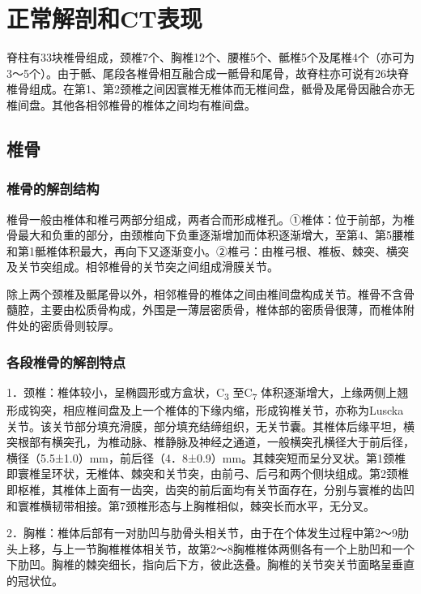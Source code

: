 \section{正常解剖和CT表现}

脊柱有33块椎骨组成，颈椎7个、胸椎12个、腰椎5个、骶椎5个及尾椎4个（亦可为3～5个）。由于骶、尾段各椎骨相互融合成一骶骨和尾骨，故脊柱亦可说有26块脊椎骨组成。在第1、第2颈椎之间因寰椎无椎体而无椎间盘，骶骨及尾骨因融合亦无椎间盘。其他各相邻椎骨的椎体之间均有椎间盘。

\subsection{椎骨}

\subsubsection{椎骨的解剖结构}

椎骨一般由椎体和椎弓两部分组成，两者合而形成椎孔。①椎体：位于前部，为椎骨最大和负重的部分，由颈椎向下负重逐渐增加而体积逐渐增大，至第4、第5腰椎和第1骶椎体积最大，再向下又逐渐变小。②椎弓：由椎弓根、椎板、棘突、横突及关节突组成。相邻椎骨的关节突之间组成滑膜关节。

除上两个颈椎及骶尾骨以外，相邻椎骨的椎体之间由椎间盘构成关节。椎骨不含骨髓腔，主要由松质骨构成，外围是一薄层密质骨，椎体部的密质骨很薄，而椎体附件处的密质骨则较厚。

\subsubsection{各段椎骨的解剖特点}

1．颈椎：椎体较小，呈椭圆形或方盒状，C\textsubscript{3}
至C\textsubscript{7}
体积逐渐增大，上缘两侧上翘形成钩突，相应椎间盘及上一个椎体的下缘内缩，形成钩椎关节，亦称为Luscka关节。该关节部分填充滑膜，部分填充结缔组织，无关节囊。其椎体后缘平坦，横突根部有横突孔，为椎动脉、椎静脉及神经之通道，一般横突孔横径大于前后径，横径（5.5±1.0）mm，前后径（4．8±0.9）mm。其棘突短而呈分叉状。第1颈椎即寰椎呈环状，无椎体、棘突和关节突，由前弓、后弓和两个侧块组成。第2颈椎即枢椎，其椎体上面有一齿突，齿突的前后面均有关节面存在，分别与寰椎的齿凹和寰椎横韧带相接。第7颈椎形态与上胸椎相似，棘突长而水平，无分叉。

2．胸椎：椎体后部有一对肋凹与肋骨头相关节，由于在个体发生过程中第2～9肋头上移，与上一节胸椎椎体相关节，故第2～8胸椎椎体两侧各有一个上肋凹和一个下肋凹。胸椎的棘突细长，指向后下方，彼此迭叠。胸椎的关节突关节面略呈垂直的冠状位。

